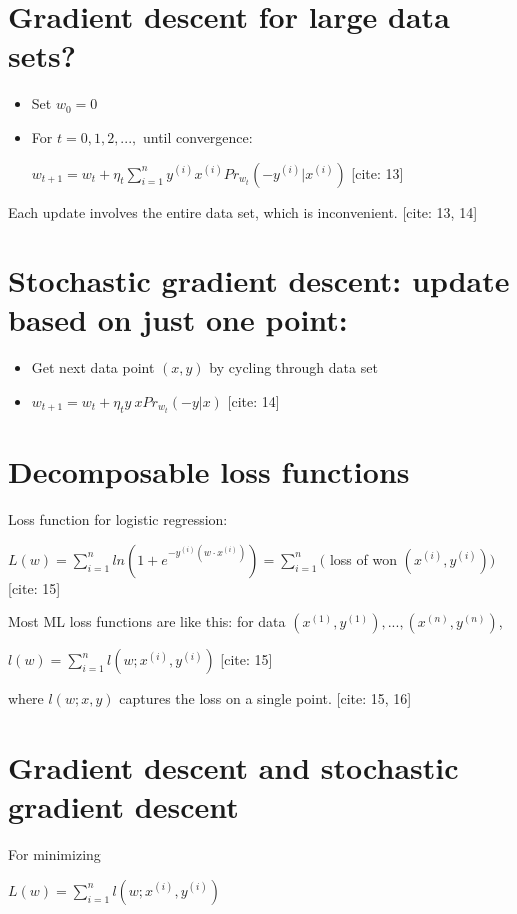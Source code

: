 \documentclass{article}
\begin{document}
\section{Gradient descent for large data sets?}

\begin{itemize}
    \item Set $w_{0}=0$
    \item For $t=0,1,2,...,$ until convergence:

    $w_{t+1}=w_{t}+\eta_{t}\sum_{i=1}^{n}y^{(i)}x^{(i)}Pr_{w_{t}}(-y^{(i)}|x^{(i)})$  [cite: 13]
\end{itemize}

Each update involves the entire data set, which is inconvenient. [cite: 13, 14]

\section{Stochastic gradient descent: update based on just one point:}

\begin{itemize}
    \item Get next data point $(x,y)$ by cycling through data set
    \item $w_{t+1}=w_{t}+\eta_{t}y~xPr_{w_{t}}(-y|x)$  [cite: 14]
\end{itemize}

\section{Decomposable loss functions}

Loss function for logistic regression:

$L(w)=\sum_{i=1}^{n}ln(1+e^{-y^{(i)}(w\cdot x^{(i)})})=\sum_{i=1}^{n}($ loss of won $(x^{(i)},y^{(i)}))$ [cite: 15]

Most ML loss functions are like this: for data $(x^{(1)},y^{(1)}),...,(x^{(n)},y^{(n)})$,

$l(w)=\sum_{i=1}^{n}l(w;x^{(i)},y^{(i)})$  [cite: 15]

where $l(w;x,y)$ captures the loss on a single point. [cite: 15, 16]

\section{Gradient descent and stochastic gradient descent}

For minimizing

$L(w)=\sum_{i=1}^{n}l(w;x^{(i)},y^{(i)})$
\end{document}
